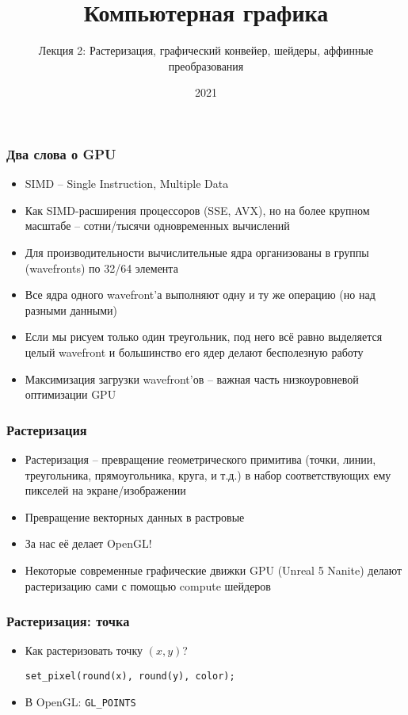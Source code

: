 \documentclass{beamer}
\title{Компьютерная графика}
\subtitle{Лекция 2: Растеризация, графический конвейер, шейдеры, аффинные преобразования}
\date{2021}
\begin{document}
\frame{\titlepage}

\begin{frame}
\frametitle{Два слова о GPU}
\pause
\begin{itemize}
\item SIMD -- Single Instruction, Multiple Data
\pause
\item Как SIMD-расширения процессоров (SSE, AVX), но на более крупном масштабе -- сотни/тысячи одновременных вычислений
\pause
\item Для производительности вычислительные ядра организованы в группы (wavefronts) по 32/64 элемента
\pause
\item Все ядра одного wavefront'а выполняют одну и ту же операцию (но над разными данными)
\pause
\item Если мы рисуем только один треугольник, под него всё равно выделяется целый wavefront и большинство его ядер делают бесполезную работу
\pause
\item Максимизация загрузки wavefront'ов -- важная часть низкоуровневой оптимизации GPU
\end{itemize}
\end{frame}

\begin{frame}
\frametitle{Растеризация}
\begin{itemize}
\item Растеризация -- превращение геометрического примитива (точки, линии, треугольника, прямоугольника, круга, и т.д.) в набор соответствующих ему пикселей на экране/изображении
\item Превращение векторных данных в растровые
\pause
\item За нас её делает OpenGL!
\pause
\item Некоторые современные графические движки GPU (Unreal 5 Nanite) делают растеризацию сами с помощью compute шейдеров
\end{itemize}
\end{frame}

\begin{frame}[fragile]
\frametitle{Растеризация: точка}
\begin{itemize}
\item Как растеризовать точку \begin{math}(x, y)\end{math}?
\pause
\begin{verbatim}
set_pixel(round(x), round(y), color);
\end{verbatim}
\pause
\item В OpenGL: \verb|GL_POINTS|
\end{itemize}
\end{frame}
\end{document}
